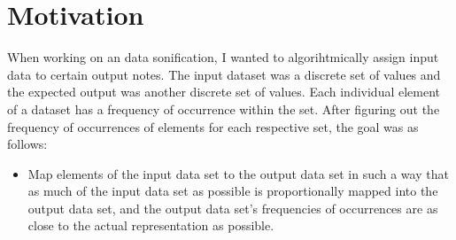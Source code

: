 \section{Motivation}
When working on an data sonification, I wanted to algorihtmically assign input data to certain output notes. 
The input dataset was a discrete set of values and the expected output was another discrete set of values. 
Each individual element of a dataset has a frequency of occurrence within the set. 
After figuring out the frequency of occurrences of elements for each respective set, the goal was as follows:
\begin{itemize}
\item[] Map elements of the input data set to the output data set in such a way that as much of the input data set as possible  is proportionally mapped into the output data set, and the output data set's frequencies of occurrences are as close to the actual representation as possible. 
\end{itemize}